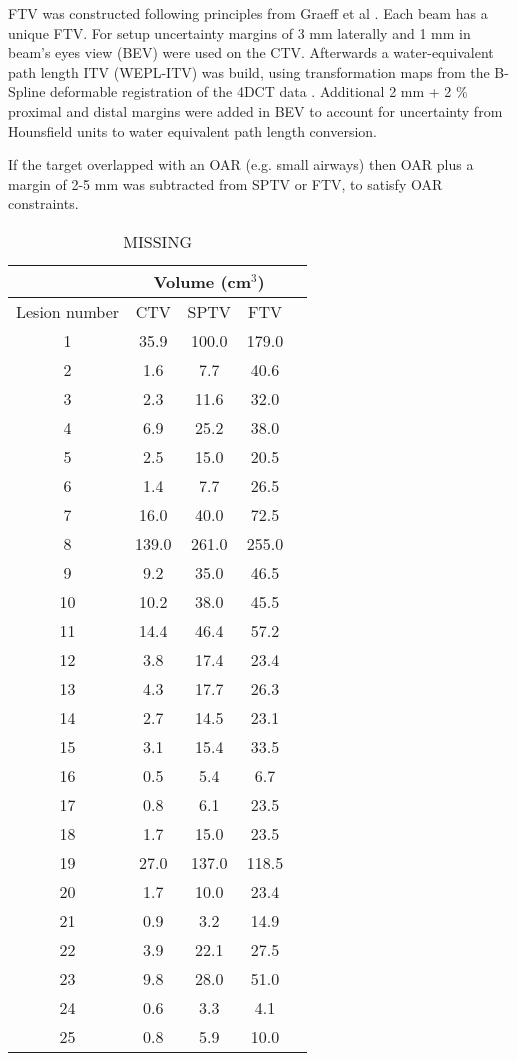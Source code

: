 \documentclass[type=dr, dr=rernat, accentcolor=tud7b,colorbacktitle, bigchapter, openright, twoside, 12pt ]{tudthesis}
\begin{document}
FTV was constructed following principles from Graeff et al \cite{Graeff2012}. Each beam has a unique FTV. For setup uncertainty margins of 3 mm laterally and 1 mm in beam’s eyes view (BEV) were used on the CTV. 
Afterwards a water-equivalent path length ITV (WEPL-ITV) was build, using transformation maps from the B-Spline deformable registration of the 4DCT data \cite{Shackleford2010}. Additional 2 mm + 2 \% proximal and distal margins 
were added in BEV to account for uncertainty from Hounsfield units to water equivalent path length conversion.

If the target overlapped with an OAR (e.g. small airways) then OAR plus a margin of 2-5 mm was subtracted from SPTV or FTV, to satisfy OAR constraints.


\begin{table}[H]
  \centering
  \caption{MISSING}
  \begin{tabular}{|c|c|c|c|c|}
    \hline\hline
     & \multicolumn{3}{|c|}{Volume (cm$^3$)} \\
     \hline
    Lesion number & CTV & SPTV & FTV\\
    \hline
    1 & 35.9 & 100.0 & 179.0  \\
    2 & 1.6 & 7.7 & 40.6 \\
    3 & 2.3 & 11.6 & 32.0 \\
    4 & 6.9 & 25.2 & 38.0 \\
    5 & 2.5 & 15.0 & 20.5 \\
    6 & 1.4 & 7.7 & 26.5 \\
    7 & 16.0 & 40.0 & 72.5 \\
    8 & 139.0 & 261.0 & 255.0 \\
    9 & 9.2 & 35.0 & 46.5 \\
    10 & 10.2 & 38.0 & 45.5 \\
    11 & 14.4 &46.4 & 57.2 \\
    12 & 3.8 & 17.4 & 23.4 \\
    13 & 4.3 & 17.7 & 26.3 \\
    14 & 2.7 & 14.5 & 23.1 \\
    15 & 3.1 & 15.4 & 33.5 \\
    16 & 0.5 & 5.4 & 6.7 \\
    17 & 0.8 & 6.1 & 23.5 \\
    18 & 1.7 & 15.0 & 23.5 \\
    19 & 27.0 & 137.0 & 118.5 \\
    20 & 1.7 & 10.0 & 23.4 \\
    21 & 0.9 & 3.2 & 14.9 \\
    22 & 3.9 & 22.1 & 27.5 \\
    23 & 9.8 & 28.0 & 51.0 \\
    24 & 0.6 & 3.3 & 4.1  \\
    25 & 0.8 & 5.9 & 10.0 \\
    \hline\hline
  \end{tabular}
  \label{tab:patdata}
\end{table}
\end{document}
